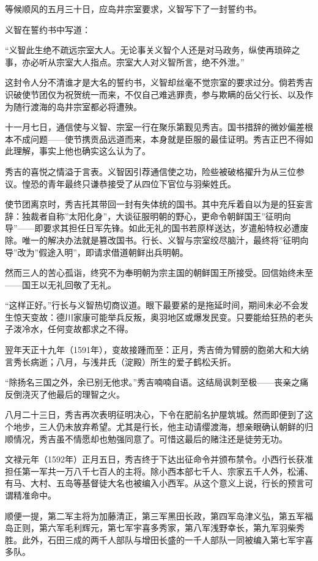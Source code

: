 \documentclass[
]{book}
\begin{document}
等候顺风的五月三十日，应岛井宗室要求，义智写下了一封誓约书。

义智在誓约书中写道：

``义智此生绝不疏远宗室大人。无论事关义智个人还是对马政务，纵使再琐碎之事，亦必听从宗室大人指点。宗室大人对义智所言，绝不外泄。''

这封令人分不清谁才是大名的誓约书，义智却丝毫不觉宗室的要求过分。倘若秀吉识破使节团仅为祝贺统一而来，不仅自己难逃罪责，参与欺瞒的岳父行长、以及作为随行渡海的岛井宗室都必将遭殃。

十一月七日，通信使与义智、宗室一行在聚乐第觐见秀吉。国书措辞的微妙偏差根本不成问题------使节携贡品远道而来，本身就是臣服的最佳证明。秀吉正巴不得如此理解，事实上他也确实这么认为了。

秀吉的喜悦之情溢于言表。义智因引荐通信使之功，险些被破格擢升为从三位参议。惶恐的青年最终只谦恭接受了从四位下官位与羽柴姓氏。

使节团离京时，秀吉托其带回一封有失体统的国书。其中充斥着自以为是的狂妄言辞：独裁者自称''太阳化身''，大谈征服明朝的野心，更命令朝鲜国王''征明向导''------即要求其担任日军先锋。如此无礼的国书若原样送达，岁遣船特权必遭废除。唯一的解决办法就是篡改国书。行长、义智与宗室绞尽脑汁，最终将''征明向导''改为''假途入明''，即请求借道朝鲜出兵明朝。

然而三人的苦心孤诣，终究不为奉明朝为宗主国的朝鲜国王所接受。回信始终未至------国王以无礼回敬了无礼。

``这样正好。''行长与义智热切商议道。眼下最要紧的是拖延时间，期间未必不会发生惊天变故：德川家康可能举兵反叛，奥羽地区或爆发民变。只要能给狂热的老头子泼冷水，任何变故都求之不得。

翌年天正十九年（1591年），变故接踵而至：正月，秀吉倚为臂膀的胞弟大和大纳言秀长病逝；八月，与浅井氏（淀殿）所生的爱子鹤松夭折。

``除扬名三国之外，余已别无他求。''秀吉喃喃自语。这结局讽刺至极------丧亲之痛反倒浇灭了他最后的理智之火。

八月二十三日，秀吉再次表明征明决心，下令在肥前名护屋筑城。然而即便到了这个地步，三人仍未放弃希望。尤其是行长，他主动请缨渡海，想亲眼确认朝鲜的归顺情况，秀吉虽不情愿却也勉强同意了。可惜这最后的赌注还是徒劳无功。

文禄元年（1592年）正月五日，秀吉终于下达出征命令并颁布禁令。小西行长获准担任第一军共一万八千七百人的主将。除小西本部七千人、宗家五千人外，松浦、有马、大村、五岛等基督徒大名也被编入小西军。从这个意义上说，行长的预言可谓精准命中。

顺便一提，第二军主将为加藤清正，第三军黑田长政，第四军岛津义弘，第五军福岛正则，第六军毛利辉元，第七军宇喜多秀家，第八军浅野幸长，第九军羽柴秀胜。此外，石田三成的两千人部队与增田长盛的一千人部队一同被编入第七军宇喜多队。
\end{document}
